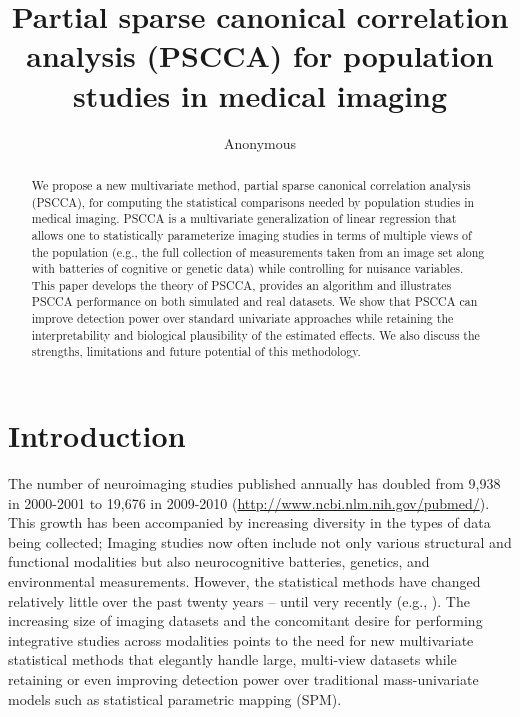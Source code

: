 \documentclass{llncs}
\begin{document}
\vspace{-0.1in}
\title{Partial sparse canonical correlation analysis (PSCCA) for population
  studies in medical imaging}
\author{Anonymous}
\maketitle              
\begin{abstract}
We propose a new multivariate method, partial sparse canonical
correlation analysis (PSCCA), for computing the statistical
comparisons needed by population studies in medical imaging.  PSCCA is a
multivariate generalization of linear regression that allows one to statistically parameterize imaging studies in terms of
multiple views of the population (e.g., the full collection of
measurements taken from an image set along with batteries of cognitive
or genetic data) while controlling for nuisance variables.  This paper
develops the theory of PSCCA, provides an algorithm and illustrates
PSCCA performance on both simulated and real datasets.  We show that
PSCCA can improve detection power over standard univariate approaches
while retaining the interpretability and biological plausibility of
the estimated effects.  We also discuss the strengths, limitations and
future potential of this methodology.
\end{abstract}
\section{Introduction}
The number of neuroimaging studies published annually has doubled from
9,938 in 2000-2001 to 19,676 in 2009-2010
(\url{http://www.ncbi.nlm.nih.gov/pubmed/}).  This growth has been
accompanied by increasing diversity in the types of data being
collected;  Imaging studies now often include not only various
structural and functional modalities but also neurocognitive
batteries, genetics, and environmental measurements.  However,
the statistical methods have changed relatively
little over the past twenty years -- until very recently
(e.g., \cite{Tosun2010a}).  The increasing size of imaging
datasets and the concomitant desire for performing integrative studies
across modalities points to the need for new multivariate statistical
methods that elegantly handle large, multi-view datasets while
retaining or even improving detection power over traditional
mass-univariate models such as statistical parametric mapping (SPM).
\end{document}
